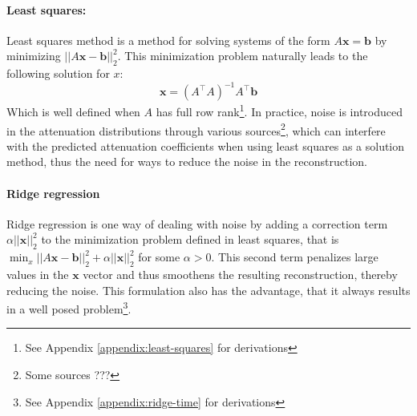 \documentclass{article}
\begin{document}
\paragraph{Least squares:} Least squares method is a method for solving systems of the form $A\mathbf{x} = \mathbf{b}$ by minimizing $||A\mathbf{x} - \mathbf{b}||_{2}^{2}$. This minimization problem naturally leads to the following solution for $x$:
\begin{equation}
    \mathbf{x} = (A^\intercal A)^{-1} A^\intercal \mathbf{b}
\end{equation}
Which is well defined when $A$ has full row rank\footnote{See Appendix \ref{appendix:least-squares} for derivations}. In practice, noise is introduced in the attenuation distributions through various sources\footnote{Some sources ???}, which can interfere with the predicted attenuation coefficients when using least squares as a solution method, thus the need for ways to reduce the noise in the reconstruction.

\paragraph{Ridge regression} Ridge regression is one way of dealing with noise by adding a correction term $\alpha ||\mathbf{x}||_2^2$ to the minimization problem defined in least squares, that is $\min_x ||A\mathbf{x} - \mathbf{b}||_2^2 + \alpha ||\mathbf{x}||_2^2$ for some $\alpha > 0$. This second term penalizes large values in the $\mathbf{x}$ vector and thus smoothens the resulting reconstruction, thereby reducing the noise. This formulation also has the advantage, that it always results in a well posed problem\footnote{See Appendix \ref{appendix:ridge-time} for derivations}.

\end{document}

